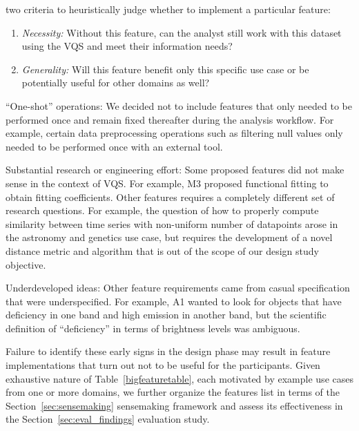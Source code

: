 {\begin{denselist}
  two criteria to heuristically judge whether to implement a particular feature:
  \begin{enumerate}[leftmargin=*]
  \item \textit{Necessity:} Without this feature, can the analyst still work with this dataset using the VQS and meet their information needs?
  \item \textit{Generality:} Will this feature benefit only this specific use case or be potentially useful for other domains as well?
  \end{enumerate}
  \item ``One-shot'' operations: We decided not to include features that only needed to be performed once and remain fixed thereafter during the analysis workflow. For example, certain data preprocessing operations such as filtering null values only needed to be performed once with an external tool.
  \item Substantial research or engineering effort: Some proposed features did not make sense in the context of VQS. For example, M3 proposed functional fitting to obtain fitting coefficients. Other features requires a completely different set of research questions. For example, the question of how to properly compute similarity between time series with non-uniform number of datapoints arose in the astronomy and genetics use case, but requires the development of a novel distance metric and algorithm that is out of the scope of our design study objective.
  \item Underdeveloped ideas: Other feature requirements came from casual specification that were underspecified. For example, A1 wanted to look for objects that have deficiency in one band and high emission in another band, but the scientific definition of ``deficiency'' in terms of brightness levels was ambiguous.
  \end{denselist}
  \par Failure to identify these early signs in the design phase may result in feature implementations that turn out not to be useful for the participants. Given exhaustive nature of Table~\ref{bigfeaturetable}, each motivated by example use cases from one or more domains, we further organize the features list in terms of the Section~\ref{sec:sensemaking} sensemaking framework and assess its effectiveness in the Section~\ref{sec:eval_findings} evaluation study.
}

